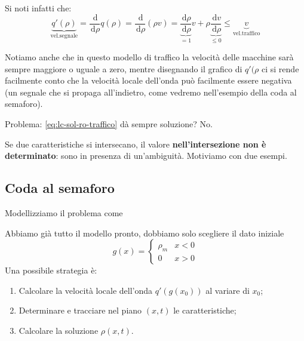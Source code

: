 \documentclass[10pt,a4paper,twoside,openright]{book}
\newcommand{\de}{\,\mathrm d}
\newcommand{\drho}{\de \rho}
\begin{document}
Si noti infatti che:
\begin{equation*}
	\underbrace{q'(\rho)}_{\text{vel.segnale}} = \frac{\de}{\drho}q(\rho) = \frac{\de}{\drho}(\rho v) = \underbrace{\frac{\drho }{\drho }}_{=1}v + \rho \underbrace{\frac{\de v}{\drho}}_{\le 0} \le \underbrace{v}_{\text{vel.traffico}}
\end{equation*}

Notiamo anche che in questo modello di traffico la velocità delle macchine sarà sempre maggiore o uguale a zero, mentre disegnando il grafico di $q'(\rho $ ci si rende facilmente conto che la velocità locale dell'onda può facilmente essere negativa (un segnale che si propaga all'indietro, come vedremo nell'esempio della coda al semaforo).

Problema: \eqref{eq:lc-sol-ro-traffico} dà sempre soluzione? No.


Se due caratteristiche si intersecano, il valore \textbf{nell'intersezione non è determinato}: sono in presenza di un'ambiguità. Motiviamo con due esempi.
\subsection{Coda al semaforo}

Modellizziamo il problema come

Abbiamo già tutto il modello pronto, dobbiamo solo scegliere il dato iniziale
\begin{equation}
	g(x) =
	\begin{cases}
		\rho _{m} & x< 0 \\
		0         & x >0 
	\end{cases}
\end{equation}
Una possibile strategia è:
\begin{enumerate}
	\item Calcolare la velocità locale dell'onda $q'(g(x_{0}))$ al variare di $x_{0}$;
	\item Determinare e tracciare nel piano $(x,t)$ le caratteristiche;
	\item Calcolare la soluzione $\rho (x,t)$.
\end{enumerate}
\end{document}
